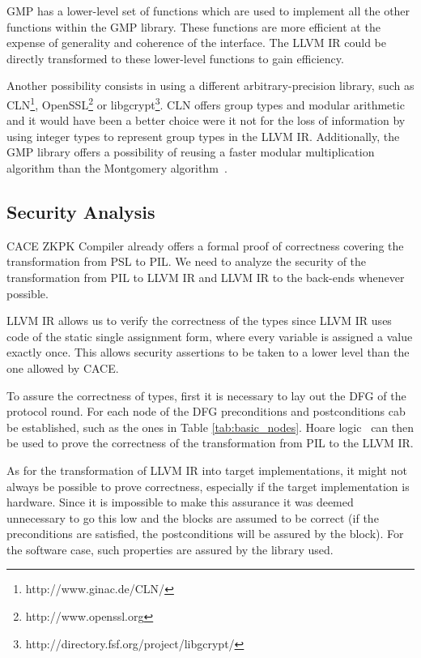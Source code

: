 GMP has a lower-level set of functions which are used to implement all
the other functions within the GMP library. These functions are more
efficient at the expense of generality and coherence of the interface.
The LLVM IR could be directly transformed to these lower-level
functions to gain efficiency.

Another possibility consists in using a different arbitrary-precision
library, such as CLN\footnote{http://www.ginac.de/CLN/},
OpenSSL\footnote{http://www.openssl.org} or
libgcrypt\footnote{http://directory.fsf.org/project/libgcrypt/}. CLN
offers group types and modular arithmetic and it would have been a
better choice were it not for the loss of information by using integer
types to represent group types in the LLVM IR. Additionally, the GMP
library offers a possibility of reusing a faster modular
multiplication algorithm than the Montgomery algorithm~\cite{Montgomery85}.

\subsection{Security Analysis}

CACE ZKPK Compiler already offers a formal proof of correctness
covering the transformation from PSL to PIL. We need to analyze the
security of the transformation from PIL to LLVM IR and LLVM IR to the
back-ends whenever possible.

LLVM IR allows us to verify the correctness of the types since LLVM IR
uses code of the static single assignment form, where every variable
is assigned a value exactly once. This allows security assertions to
be taken to a lower level than the one allowed by CACE. 

To assure the correctness of types, first it is necessary to lay out
the DFG of the protocol round. For each node of the DFG preconditions
and postconditions cab be established, such as the ones in Table
\ref{tab:basic_nodes}. Hoare logic~\cite{hoare_logic} can then be
used to prove the correctness of the transformation from PIL to the
LLVM IR.

As for the transformation of LLVM IR into target implementations, it
might not always be possible to prove correctness, especially if the
target implementation is hardware. Since it is impossible to make this
assurance it was deemed unnecessary to go this low and the blocks are
assumed to be correct (if the preconditions are satisfied, the
postconditions will be assured by the block). For the software case,
such properties are assured by the library used.

